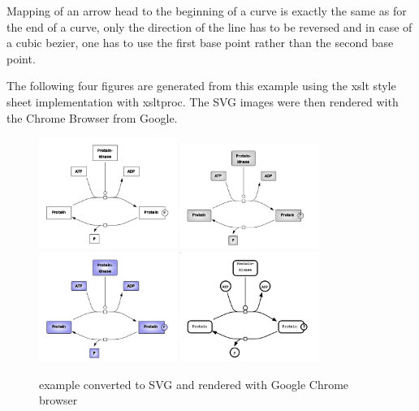 Mapping of an arrow head to the beginning of a curve is exactly the same as for the end of a curve, only the
direction of the line has to be reversed and in case of a cubic bezier, one has to use the first base point rather than the second base point. 

The following four figures are generated from this example using the xslt style sheet implementation with xsltproc.
The SVG images were then rendered with the Chrome Browser from Google.

\begin{figure}[!ht]
\begin{center}
\includegraphics[width=0.4\textwidth]{figures/Phosphorylation_wireFrame}
\includegraphics[width=0.4\textwidth]{figures/Phosphorylation_gray}
\includegraphics[width=0.4\textwidth]{figures/Phosphorylation_color}
\includegraphics[width=0.4\textwidth]{figures/Phosphorylation_SBGN}
\end{center}
\caption{example converted to SVG and rendered with Google Chrome browser}
\label{ExampleRendering}
\end{figure}



